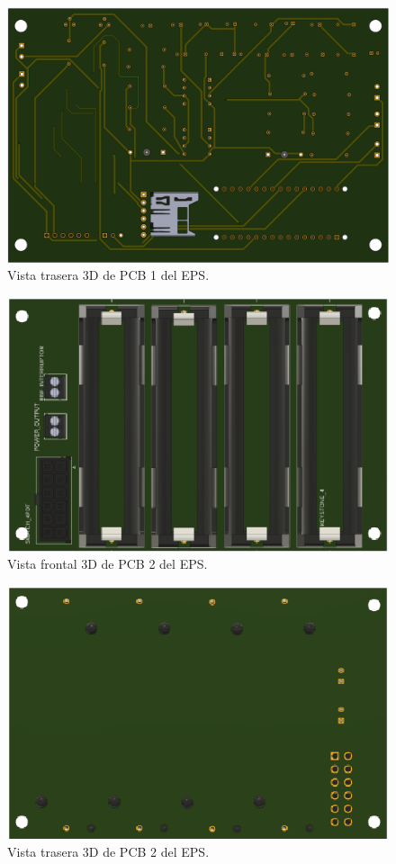\begin{figure}[h]
  \centering
  \includegraphics[width=\textwidth]{Pictures/EPS_FINAL2.png}
  \caption{Vista trasera 3D de PCB 1 del EPS.}
  \label{fig:EPS_Final2}
\end{figure}
\newpage

\begin{figure}[h]
  \centering
  \includegraphics[width=\textwidth]{Pictures/EPS_FINAL4.png}
  \caption{Vista frontal 3D de PCB 2 del EPS.}
  \label{fig:EPS_Final3}
\end{figure}

\begin{figure}[h]
  \centering
  \includegraphics[width=\textwidth]{Pictures/EPS_FINAL3.png}
  \caption{Vista trasera 3D de PCB 2 del EPS.}
  \label{fig:EPS_Final4}
\end{figure}
\newpage


